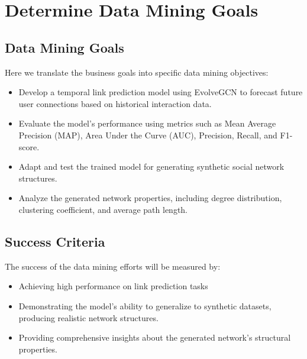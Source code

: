 \section{Determine Data Mining Goals}

\subsection*{Data Mining Goals}

Here we translate the business goals into specific data mining objectives:

\begin{itemize}
	\item Develop a temporal link prediction model using EvolveGCN to forecast future user connections based on historical interaction data.
	\item Evaluate the model's performance using metrics such as Mean Average Precision (MAP), Area Under the Curve (AUC), Precision, Recall, and F1-score.
	\item Adapt and test the trained model for generating synthetic social network structures.
	\item Analyze the generated network properties, including degree distribution, clustering coefficient, and average path length.
\end{itemize}

\subsection*{Success Criteria}
\label{sec:datamining_success}

The success of the data mining efforts will be measured by:

\begin{itemize}
	\item Achieving high performance on link prediction tasks
	\item Demonstrating the model's ability to generalize to synthetic datasets, producing realistic network structures.
	\item Providing comprehensive insights about the generated network's structural properties.
\end{itemize}